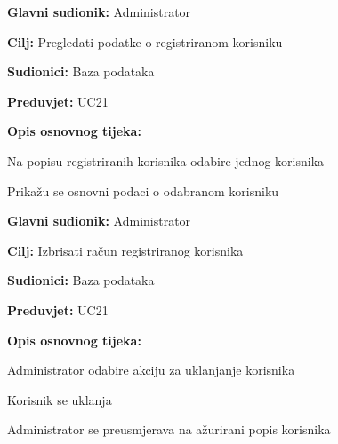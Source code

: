 \noindent {}
\begin{packed_item}
	
	\item \textbf{Glavni sudionik:} Administrator
	\item  \textbf{Cilj:} Pregledati podatke o registriranom korisniku
	\item  \textbf{Sudionici:} Baza podataka
	\item  \textbf{Preduvjet:} UC21
	\item  \textbf{Opis osnovnog tijeka:}
	
	\item[] \begin{packed_enum}

		\item Na popisu registriranih korisnika odabire jednog korisnika
		\item Prikažu se osnovni podaci o odabranom korisniku

	\end{packed_enum}
\end{packed_item}



\noindent {}
\begin{packed_item}
	
	\item \textbf{Glavni sudionik:} Administrator
	\item  \textbf{Cilj:} Izbrisati račun registriranog korisnika
	\item  \textbf{Sudionici:} Baza podataka
	\item  \textbf{Preduvjet:} UC21
	\item  \textbf{Opis osnovnog tijeka:}
	
	\item[] \begin{packed_enum}

		\item Administrator odabire akciju za uklanjanje korisnika
		\item Korisnik se uklanja
		\item Administrator se preusmjerava na ažurirani popis korisnika

	\end{packed_enum}
\end{packed_item}

\pagebreak

